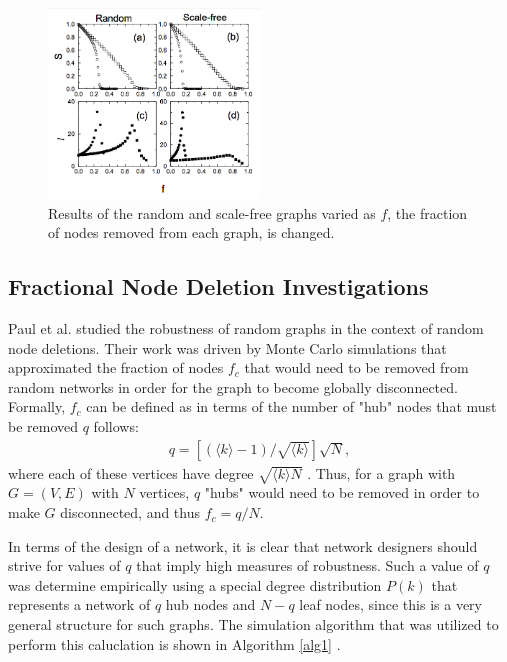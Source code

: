 \documentclass[doc]{apa}%
\begin{document}
\begin{figure}[ht]
	\label{fig:RandomResults}
	\centering
		\includegraphics[width=0.5\textwidth]{random_results.png}
	\caption{Results of the random and scale-free graphs varied as $f$, the fraction of nodes removed from each graph, is changed.} %
\end{figure}

\subsection{Fractional Node Deletion Investigations} 
Paul et al. studied the robustness of random graphs in the context of random node deletions. Their work was driven by Monte Carlo simulations that approximated the fraction of nodes $f_c$ that would need to be removed from random networks in order for the graph to become globally disconnected. Formally, $f_c$ can be defined as in terms of the number of "hub" nodes that must be removed $q$ follows:
\begin{eqnarray*}
q = \left[(\langle k \rangle - 1) / \sqrt{\langle k \rangle}\right]\sqrt{N},
\end{eqnarray*}
where each of these vertices have degree $\sqrt{\langle k \rangle N}$ \cite{asd}. Thus, for a graph with $G = (V,E)$ with $N$ vertices, $q$ "hubs" would need to be removed in order to make $G$ disconnected, and thus $f_c = q/N$.

In terms of the design of a network, it is clear that network designers should strive for values of $q$ that imply high measures of robustness. Such a value of $q$ was determine empirically using a special degree distribution $P(k)$ that represents a network of $q$ hub nodes and $N-q$ leaf nodes, since this is a very general structure for such graphs. The simulation algorithm that was utilized to perform this caluclation is shown in Algorithm \ref{alg1} \cite{asd}. %
\end{document}
